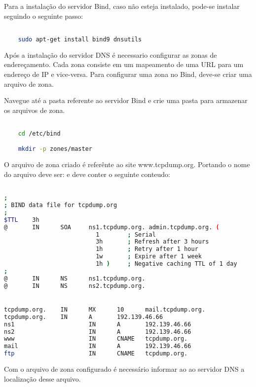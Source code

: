 \documentclass[a4paper]{report} %
\begin{document}
Para a instalação do servidor Bind, caso não esteja instalado, pode-se instalar seguindo o seguinte passo:

\begin{lstlisting}[language=bash]

	sudo apt-get install bind9 dnsutils

\end{lstlisting}

Após a instalação do servidor DNS é necessario configurar as zonas de endereçamento. Cada zona consiste em um mapeamento de uma URL para um endereço de IP e vice-versa. Para configurar uma zona no Bind, deve-se criar uma arquivo de zona.

Navegue até a pasta referente ao servidor Bind e crie uma pasta para armazenar os arquivos de zona.

\begin{lstlisting}[language=bash]

	cd /etc/bind

	mkdir -p zones/master

\end{lstlisting}

O arquivo de zona criado é referênte ao site www.tcpdump.org. Portando o nome do arquivo deve ser:  e deve conter o seguinte conteudo:

\begin{lstlisting}[language=bash]

;
; BIND data file for tcpdump.org
;
$TTL    3h
@       IN      SOA     ns1.tcpdump.org. admin.tcpdump.org. (
                          1        ; Serial
                          3h       ; Refresh after 3 hours
                          1h       ; Retry after 1 hour
                          1w       ; Expire after 1 week
                          1h )     ; Negative caching TTL of 1 day
;
@       IN      NS      ns1.tcpdump.org.
@       IN      NS      ns2.tcpdump.org.


tcpdump.org.    IN      MX      10      mail.tcpdump.org.
tcpdump.org.    IN      A       192.139.46.66
ns1                     IN      A       192.139.46.66
ns2                     IN      A       192.139.46.66
www                     IN      CNAME   tcpdump.org.
mail                    IN      A       192.139.46.66
ftp                     IN      CNAME   tcpdump.org.

\end{lstlisting}

Com o arquivo de zona configurado é necessário informar ao ao servidor DNS a localização desse arquivo.
\end{document}
